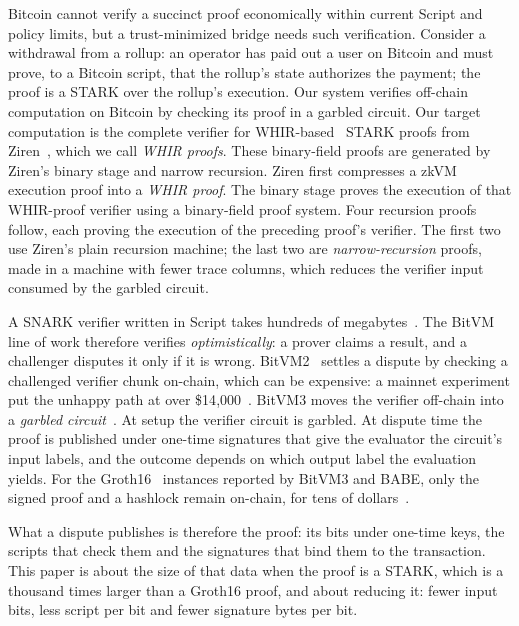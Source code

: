 \documentclass[11pt]{article}
\begin{document}
Bitcoin cannot verify a succinct proof economically within current Script and
policy limits, but a trust-minimized bridge needs such verification. Consider a
withdrawal from a rollup: an operator has paid out a user on Bitcoin and must
prove, to a Bitcoin script, that the rollup's state authorizes the payment; the
proof is a STARK over the rollup's execution. Our system verifies off-chain
computation on Bitcoin by checking its proof in a garbled circuit. Our target
computation is the complete verifier for WHIR-based~\cite{whir25} STARK proofs from Ziren~\cite{duan26ziren},
which we call \emph{WHIR proofs}. These binary-field proofs are generated
by Ziren's binary stage and narrow recursion. Ziren first compresses a zkVM
execution proof into a \emph{WHIR proof}. The binary stage proves the
execution of that WHIR-proof verifier using a binary-field proof system.
Four recursion proofs follow, each proving the execution of the preceding
proof's verifier. The first two use Ziren's plain recursion machine; the last
two are \emph{narrow-recursion} proofs, made in a machine with fewer trace
columns, which reduces the verifier input consumed by the garbled circuit.

A SNARK verifier written in Script takes hundreds of megabytes~\cite{babe2026}. The BitVM line of work therefore verifies \emph{optimistically}: a prover claims
a result, and a challenger disputes it only if it is wrong.
BitVM2~\cite{laa25bitvm2} settles a dispute by checking a challenged
verifier chunk on-chain, which can be expensive: a mainnet experiment
put the unhappy path at over \$14{,}000~\cite{babe2026}. BitVM3 moves the
verifier off-chain into a \emph{garbled circuit}~\cite{bitvm3paper,che25sok}.
At setup the verifier circuit is garbled. At dispute time the proof is published
under one-time signatures that give the evaluator the circuit's input labels, and
the outcome depends on which output label the evaluation yields. For the
Groth16~\cite{gro16} instances reported by BitVM3 and BABE, only the signed proof and
a hashlock remain on-chain, for tens of dollars~\cite{babe2026}.

What a dispute publishes is therefore the proof: its bits under one-time keys, the
scripts that check them and the signatures that bind them to the transaction.
This paper is about the size of that data when the proof is a STARK, which is
a thousand times larger than a Groth16 proof, and about reducing it: fewer
input bits, less script per bit and fewer signature bytes per bit.
\end{document}

